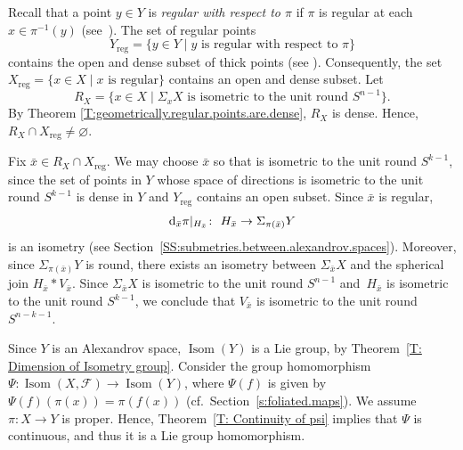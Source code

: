 \documentclass[10pt,a4paper]{amsart}
\numberwithin{equation}{section}
\theoremstyle{definition}
\DeclareMathOperator{\Iso}{Isom}
\newcommand{\Sp}{S} %
\newcommand{\fol}{\mathcal{F}}
\begin{document}
Recall that a point $y\in Y$ is \emph{regular with respect to $\pi$} if $\pi$ is regular at each $x\in \pi^{-1}(y)$ (see~\cite[Definition 6.5]{Lytchak}).
The set of regular points
\[
Y_{\mathrm{reg}}=\{y\in Y\mid y \mbox{ is regular with respect to }\pi\}
\]
contains the open and dense subset of thick points (see \cite[end of Section~6]{Lytchak}).
Consequently, the set
$
X_{\mathrm{reg}}= \{x\in X\mid x \mbox{ is regular}\}
$
contains an open and dense subset.
Let
\[
R_X = \big\{x\in X\mid \Sigma_x X \mbox{ is isometric to the unit round } \Sp^{n-1}\big\}.
\]
By Theorem \ref{T:geometrically.regular.points.are.dense}, $R_X$ is dense. Hence, $R_X\cap X_{\mathrm{reg}}\neq \varnothing$.

Fix $\bar{x}\in R_X\cap X_{\mathrm{reg}}$.
We may choose $\bar{x}$ so that  is isometric to the unit round $\Sp^{k-1}$, since the set of points in $Y$ whose space of directions is isometric to the unit round $\Sp^{k-1}$ is dense in $Y$ and $Y_{\mathrm{reg}}$ contains an open subset.
Since $\bar{x}$ is regular,
\[
{\rm d}_{\bar{x}} \pi|_{H_{\bar{x}}}\colon\ H_{\bar{x}}\to \Sigma_{\pi(\bar{x})} Y
\]
is an isometry (see Section~\ref{SS:submetries.between.alexandrov.spaces}). Moreover, since $\Sigma_{\pi(\bar{x})} Y$ is round, there exists an isometry between $\Sigma_{\bar{x}} X$ and the spherical join $H_{\bar{x}}* V_{\bar{x}}$. Since $\Sigma_{\bar{x}} X$ is isometric to the unit round $\Sp^{n-1}$ and~$H_{\bar{x}}$ is isometric to the unit round $\Sp^{k-1}$, we conclude that $V_{\bar{x}}$ is isometric to the unit round~$S^{n-k-1}$.

Since $Y$ is an Alexandrov space, $\Iso(Y)$ is a Lie group, by Theorem~\ref{T: Dimension of Isometry group}. Consider the group homomorphism
$
\Psi\colon \Iso (X,\fol) \to \Iso (Y)$,
where $\Psi(f)$ is given by
$\Psi(f)(\pi(x)) = \pi(f(x))$ (cf.\ Section~\ref{s:foliated.maps}). We assume $\pi\colon X\to Y$ is proper. Hence, Theorem~\ref{T: Continuity of psi} implies that $\Psi$ is continuous, and thus it is a Lie group homomorphism.
\end{document}
